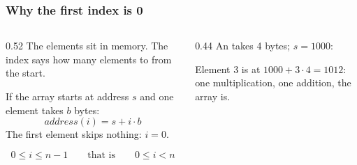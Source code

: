 \documentclass[aspectratio=169,10pt,compress]{beamer}
\begin{document}
\begin{frame}[t,fragile] \frametitle{Why the first index is 0}
	\begin{columns}[T]
		\begin{column}{0.52\textwidth}
			The elements sit  in memory.
			The index says how many elements to  from the start.

			\vspace{0.5em}
			If the array starts at address $s$ and one element takes $b$ bytes:
			\[
				\mathit{address}(i) = s + i \cdot b
			\]
			The first element skips nothing: $i = 0$.
			\cite{knuth1973artv1}

			\vspace{0.5em}
			\[
				0 \le i \le n - 1
				\qquad \text{that is} \qquad
				0 \le i < n
			\]
		\end{column}
		\begin{column}{0.44\textwidth}
			An  takes 4 bytes; $s = 1000$:

			\vspace{0.5em}

			\vspace{1em}
			\small Element 3 is at $1000 + 3 \cdot 4 = 1012$:
			one multiplication, one addition,  the array is.
		\end{column}
	\end{columns}
\end{frame}
\end{document}
